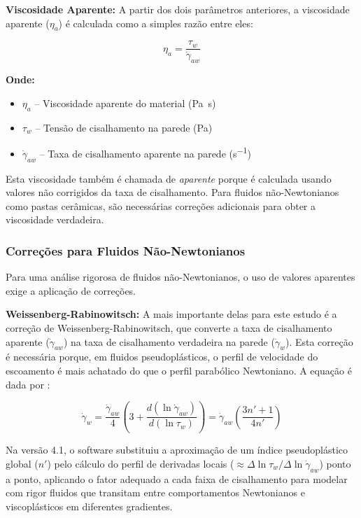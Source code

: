 \documentclass[a4paper,12pt]{article}
\begin{document}
\vspace{1em}
\textbf{Viscosidade Aparente:} A partir dos dois parâmetros anteriores, a viscosidade aparente ($\eta_a$) é calculada como a simples razão entre eles:

\begin{equation}
    \eta_a = \frac{\tau_w}{\dot{\gamma}_{aw}}
\end{equation}

\textbf{Onde:}
\begin{itemize}[leftmargin=1.5em]
  \item $\eta_a$ -- Viscosidade aparente do material (\si{Pa.s})
  \item $\tau_w$ -- Tensão de cisalhamento na parede (\si{Pa})
  \item $\dot{\gamma}_{aw}$ -- Taxa de cisalhamento aparente na parede (\si{s^{-1}})
\end{itemize}

Esta viscosidade também é chamada de \textit{aparente} porque é calculada usando valores não corrigidos da taxa de cisalhamento. Para fluidos não-Newtonianos como pastas cerâmicas, são necessárias correções adicionais para obter a viscosidade verdadeira.

\subsubsection*{Correções para Fluidos Não-Newtonianos}
Para uma análise rigorosa de fluidos não-Newtonianos, o uso de valores aparentes exige a aplicação de correções.

\textbf{Weissenberg-Rabinowitsch:} A mais importante delas para este estudo é a correção de Weissenberg-Rabinowitsch, que converte a taxa de cisalhamento aparente ($\dot{\gamma}_{aw}$) na taxa de cisalhamento verdadeira na parede ($\dot{\gamma}_w$). Esta correção é necessária porque, em fluidos pseudoplásticos, o perfil de velocidade do escoamento é mais achatado do que o perfil parabólico Newtoniano. A equação é dada por \cite{barnes1989}:

\begin{equation}
    \dot{\gamma}_w = \frac{\dot{\gamma}_{aw}}{4} \left( 3 + \frac{d(\ln \dot{\gamma}_{aw})}{d(\ln \tau_w)} \right) = \dot{\gamma}_{aw} \left( \frac{3n' + 1}{4n'} \right)
\end{equation}

Na versão 4.1, o software substituiu a aproximação de um índice pseudoplástico global ($n'$) pelo cálculo do perfil de derivadas locais ($\approx \Delta \ln \tau_w / \Delta \ln \dot{\gamma}_{aw}$) ponto a ponto, aplicando o fator adequado a cada faixa de cisalhamento para modelar com rigor fluidos que transitam entre comportamentos Newtonianos e viscoplásticos em diferentes gradientes.
\end{document}
